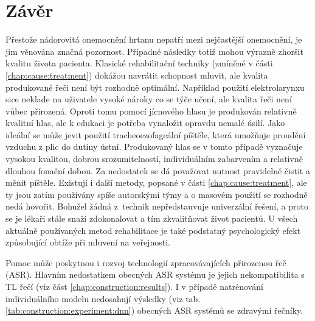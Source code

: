 \chapter{Závěr}
\label{chap:conclusion}

Přestože nádorovitá onemocnění hrtanu nepatří mezi nejčastější onemocnění, je
jim věnována značná pozornost. Případné následky totiž mohou výrazně zhoršit
kvalitu života pacienta. Klasické rehabilitační techniky (zmíněné v části
\ref{chap:cause:treatment}) dokážou navrátit schopnost mluvit, ale kvalita
produkované řeči není být rozhodně optimální. Například použití
elektrolarynxu sice neklade na uživatele vysoké nároky co se týče učení, ale
kvalita řeči není vůbec přirozená. Oproti tomu pomocí jícnového hlasu je
produkován relativně kvalitní hlas, ale k edukaci je potřeba vynaložit opravdu
nemalé úsilí. Jako ideální se může jevit použití tracheoezofageální píštěle,
která umožňuje proudění vzduchu z plic do dutiny ústní. Produkovaný hlas se v
tomto případě vyznačuje vysokou kvalitou, dobrou srozumitelností,
individuálním zabarvením a relativně dlouhou fonační dobou. Za nedostatek se
dá považovat nutnost pravidelně čistit a měnit píštěle. Existují i další
metody, popsané v části \ref{chap:cause:treatment}, ale ty jsou zatím používány
spíše autorskými týmy a o masovém použití se rozhodně nedá hovořit. Bohužel
žádná z~technik nepředstauvuje univerzální řešení, a proto se je lékaři
stále snaží zdokonalovat a tím zkvalitňovat život pacientů. U všech aktuálně používaných metod rehabilitace je také podstatný psychologický efekt způsobující obtíže při mluvení na veřejnosti.

Pomoc může poskytnou i rozvoj technologií zpracovávajících přirozenou řeč (ASR). Hlavním nedostatkem obecných ASR systému je jejich nekompatibilita s TL řečí (viz část \ref{chap:construction:results}). I v případě natrénování individuálního modelu nedosahují výsledky (viz tab. \ref{tab:construction:experiment:dnn}) obecných ASR systémů se zdravými řečníky.




